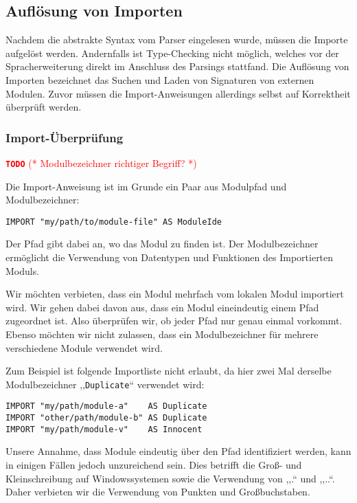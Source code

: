 \documentclass[runningheads]{llncs}
\newcommand{\TODO}[1]{ \textcolor{red}{\textbf{\texttt{\large{TODO}}} (* #1 *)}\par}
\begin{document}
\subsection{Auflösung von Importen}
\label{sec:imports}

Nachdem die abstrakte Syntax vom Parser eingelesen wurde, müssen die Importe aufgelöst werden. Andernfalls ist Type-Checking nicht möglich, welches vor der Spracherweiterung direkt im Anschluss des Parsings stattfand. Die Auflösung von Importen bezeichnet das Suchen und Laden von Signaturen von externen Modulen. Zuvor müssen die Import-Anweisungen allerdings selbst auf Korrektheit überprüft werden.

\subsubsection{Import-Überprüfung}
\label{sec:semanticsimports}

\TODO{Modulbezeichner richtiger Begriff?}

Die Import-Anweisung ist im Grunde ein Paar aus Modulpfad und Modulbezeichner:

\begin{verbatim}
IMPORT "my/path/to/module-file" AS ModuleIde
\end{verbatim}

Der Pfad gibt dabei an, wo das Modul zu finden ist. Der Modulbezeichner ermöglicht die Verwendung von Datentypen und Funktionen des Importierten Moduls.

Wir möchten verbieten, dass ein Modul mehrfach vom lokalen Modul importiert wird. Wir gehen dabei davon aus, dass ein Modul eineindeutig einem Pfad zugeordnet ist. Also überprüfen wir, ob jeder Pfad nur genau einmal vorkommt. Ebenso möchten wir nicht zulassen, dass ein Modulbezeichner für mehrere verschiedene Module verwendet wird.

Zum Beispiel ist folgende Importliste nicht erlaubt, da hier zwei Mal derselbe Modulbezeichner ,,\verb|Duplicate|`` verwendet wird:

\begin{verbatim}
IMPORT "my/path/module-a"    AS Duplicate
IMPORT "other/path/module-b" AS Duplicate
IMPORT "my/path/module-v"    AS Innocent
\end{verbatim}

Unsere Annahme, dass Module eindeutig über den Pfad identifiziert werden, kann in einigen Fällen jedoch unzureichend sein. Dies betrifft die Groß- und Kleinschreibung auf Windowssystemen sowie die Verwendung von ,,.`` und ,,..``. Daher verbieten wir die Verwendung von Punkten und Großbuchstaben.
\end{document}
